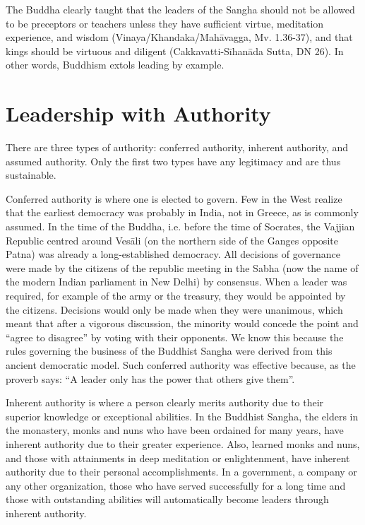 ﻿\documentclass[11pt, openany]{book}
\begin{document}
The Buddha clearly taught that the leaders of the Sangha should not be allowed to be preceptors or teachers unless they have sufficient virtue, meditation experience, and wisdom (Vinaya/Khandaka/Mahāvagga, Mv. 1.36-37), and that kings should be virtuous and diligent (Cakkavatti-Sīhanāda Sutta, DN 26). In other words, Buddhism extols leading by example.

\section{Leadership with Authority}

There are three types of authority: conferred authority, inherent authority, and assumed authority. Only the first two types have any legitimacy and are thus sustainable.

Conferred authority is where one is elected to govern. Few in the West realize that the earliest democracy was probably in India, not in Greece, as is commonly assumed. In the time of the Buddha, i.e. before the time of Socrates, the Vajjian Republic centred around Vesāli (on the northern side of the Ganges opposite Patna) was already a long-established democracy. All decisions of governance were made by the citizens of the republic meeting in the Sabha (now the name of the modern Indian parliament in New Delhi) by consensus. When a leader was required, for example of the army or the treasury, they would be appointed by the citizens. Decisions would only be made when they were unanimous, which meant that after a vigorous discussion, the minority would concede the point and “agree to disagree” by voting with their opponents. We know this because the rules governing the business of the Buddhist Sangha were derived from this ancient democratic model. Such conferred authority was effective because, as the proverb says: “A leader only has the power that others give them”.

Inherent authority is where a person clearly merits authority due to their superior knowledge or exceptional abilities. In the Buddhist Sangha, the elders in the monastery, monks and nuns who have been ordained for many years, have inherent authority due to their greater experience. Also, learned monks and nuns, and those with attainments in deep meditation or enlightenment, have inherent authority due to their personal accomplishments. In a government, a company or any other organization, those who have served successfully for a long time and those with outstanding abilities will automatically become leaders through inherent authority.
\end{document}
